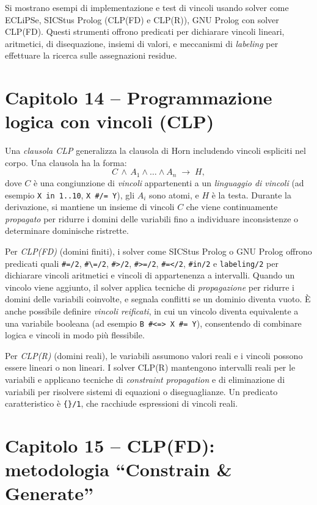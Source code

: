 \documentclass[12pt]{article}
\begin{document}
Si mostrano esempi di implementazione e test di vincoli usando solver come ECLiPSe, SICStus Prolog (CLP(FD) e CLP(R)), GNU Prolog con solver CLP(FD). Questi strumenti offrono predicati per dichiarare vincoli lineari, aritmetici, di disequazione, insiemi di valori, e meccanismi di \emph{labeling} per effettuare la ricerca sulle assegnazioni residue.

\section*{Capitolo 14 – Programmazione logica con vincoli (CLP)}

Una \emph{clausola CLP} generalizza la clausola di Horn includendo vincoli espliciti nel corpo. Una clausola ha la forma:
\[
  C \,\land\, A_1 \land \dots \land A_n \;\to\; H,
\]
dove $C$ è una congiunzione di \emph{vincoli} appartenenti a un \emph{linguaggio di vincoli} (ad esempio \texttt{X in 1..10}, \texttt{X \#\!/=\ Y}), gli $A_i$ sono atomi, e $H$ è la testa. Durante la derivazione, si mantiene un insieme di vincoli $C$ che viene continuamente \emph{propagato} per ridurre i domini delle variabili fino a individuare inconsistenze o determinare dominische ristrette.

Per \emph{CLP(FD)} (domini finiti), i solver come SICStus Prolog o GNU Prolog offrono predicati quali \texttt{\#=/2}, \texttt{\#\textbackslash=/2}, \texttt{\#>/2}, \texttt{\#>=/2}, \texttt{\#=</2}, \texttt{\#in/2} e \texttt{labeling/2} per dichiarare vincoli aritmetici e vincoli di appartenenza a intervalli. Quando un vincolo viene aggiunto, il solver applica tecniche di \emph{propagazione} per ridurre i domini delle variabili coinvolte, e segnala conflitti se un dominio diventa vuoto. È anche possibile definire \emph{vincoli reificati}, in cui un vincolo diventa equivalente a una variabile booleana (ad esempio \texttt{B \#<=> X \#= Y}), consentendo di combinare logica e vincoli in modo più flessibile.

Per \emph{CLP(R)} (domini reali), le variabili assumono valori reali e i vincoli possono essere lineari o non lineari. I solver CLP(R) mantengono intervalli reali per le variabili e applicano tecniche di \emph{constraint propagation} e di eliminazione di variabili per risolvere sistemi di equazioni o diseguaglianze. Un predicato caratteristico è \texttt{\{\}/1}, che racchiude espressioni di vincoli reali.

\section*{Capitolo 15 – CLP(FD): metodologia ``Constrain \& Generate''}
\end{document}
